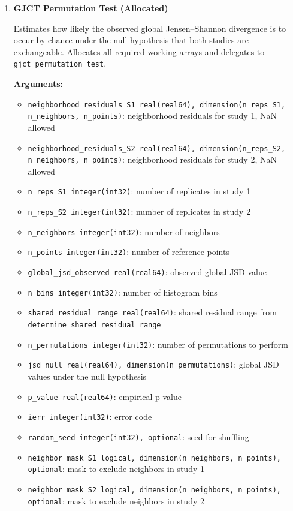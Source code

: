 \begin{enumerate}
        \begin{lstlisting}[caption={Weighted Global Divergence}]
call compute_weighted_global_divergence(js_divergences, n_points, included_n_reps_S1, &
    included_n_reps_S2, global_js_divergence, weights, ierr)
        \end{lstlisting}

    \item \textbf{GJCT Permutation Test (Allocated)}

        Estimates how likely the observed global Jensen–Shannon divergence is to occur by chance under the null hypothesis that both studies are exchangeable.  
        Allocates all required working arrays and delegates to \lstinline!gjct_permutation_test!.

        \textbf{Arguments:}
        \begin{itemize}
            \item \lstinline!neighborhood_residuals_S1 real(real64), dimension(n_reps_S1, n_neighbors, n_points)!: neighborhood residuals for study 1, NaN allowed
            \item \lstinline!neighborhood_residuals_S2 real(real64), dimension(n_reps_S2, n_neighbors, n_points)!: neighborhood residuals for study 2, NaN allowed
            \item \lstinline!n_reps_S1 integer(int32)!: number of replicates in study 1
            \item \lstinline!n_reps_S2 integer(int32)!: number of replicates in study 2
            \item \lstinline!n_neighbors integer(int32)!: number of neighbors
            \item \lstinline!n_points integer(int32)!: number of reference points
            \item \lstinline!global_jsd_observed real(real64)!: observed global JSD value
            \item \lstinline!n_bins integer(int32)!: number of histogram bins
            \item \lstinline!shared_residual_range real(real64)!: shared residual range from \lstinline!determine_shared_residual_range!
            \item \lstinline!n_permutations integer(int32)!: number of permutations to perform
            \item \lstinline!jsd_null real(real64), dimension(n_permutations)!: global JSD values under the null hypothesis
            \item \lstinline!p_value real(real64)!: empirical p‑value
            \item \lstinline!ierr integer(int32)!: error code
            \item \lstinline!random_seed integer(int32), optional!: seed for shuffling
            \item \lstinline!neighbor_mask_S1 logical, dimension(n_neighbors, n_points), optional!: mask to exclude neighbors in study 1
            \item \lstinline!neighbor_mask_S2 logical, dimension(n_neighbors, n_points), optional!: mask to exclude neighbors in study 2
        \end{itemize}


\end{enumerate}
